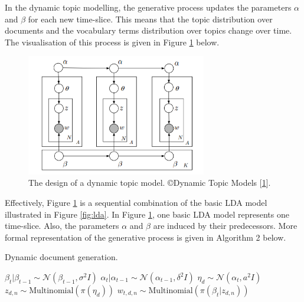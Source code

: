 \documentclass{mprop}
\begin{document}
\par In the dynamic topic modelling, the generative process updates the parameters $\alpha$ and $\beta$ for each new time-slice. This means that the topic distribution over documents and the vocabulary terms distribution over topics change over time. The visualisation of this process is given in Figure \ref{fig:dtm} below.
\begin{figure}[H]
  \centering
  \includegraphics[width=0.7\textwidth]{dynamic_topic_model}
  \caption{The design of a dynamic topic model. \copyright Dynamic Topic Models [\ref{fig:dtm}].}
  \label{fig:dtm}
\end{figure}
Effectively, Figure \ref{fig:dtm} is a sequential combination of the basic LDA model illustrated in Figure \ref{fig:lda}. In Figure \ref{fig:dtm}, one basic LDA model represents one time-slice. Also, the parameters $\alpha$ and $\beta$ are induced by their predecessors. More formal representation of the generative process is given in Algorithm 2 below. 
\begin{algorithm}[H]
\caption{Dynamic document generation.}
\label{alg:dynamic_document_generation}
\begin{algorithmic}[2]
\State $\beta_t | \beta_{t-1} \sim \mathcal{N}(\beta_{t-1}, \sigma^2I)$
\State $\alpha_t | \alpha_{t-1} \sim \mathcal{N}(\alpha_{t-1}, \delta^2I)$
\State $\eta_d \sim \mathcal{N}(\alpha_{t}, a^2I)$
\State $z_{d, n} \sim \mbox{Multinomial}(\pi(\eta_d))$
\State $w_{t, d, n} \sim \mbox{Multinomial}(\pi(\beta_t | z_{d, n}))$
\EndFor
\EndFor
\end{algorithmic}
\end{algorithm}
\end{document}
